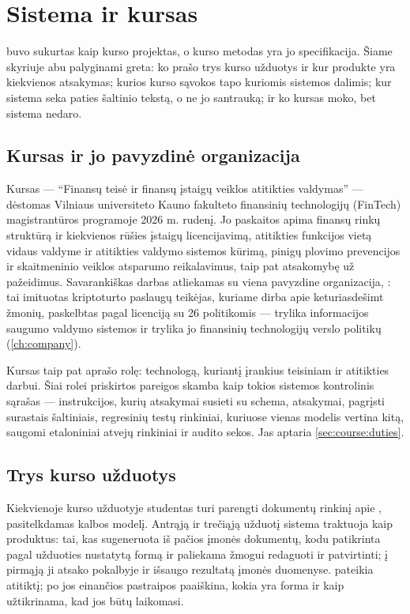 \chapter{Sistema ir kursas}\label{ch:course}

\product{} buvo sukurtas kaip kurso projektas, o kurso metodas yra jo specifikacija. Šiame
skyriuje abu palyginami greta: ko prašo trys kurso užduotys ir kur produkte yra kiekvienos
atsakymas; kurios kurso sąvokos tapo kuriomis sistemos dalimis; kur sistema seka paties šaltinio
tekstą, o ne jo santrauką; ir ko kursas moko, bet sistema nedaro.

\section{Kursas ir jo pavyzdinė organizacija}\label{sec:course:course}

Kursas --- \enquote{Finansų teisė ir finansų įstaigų veiklos atitikties valdymas} --- dėstomas
Vilniaus universiteto Kauno fakulteto finansinių technologijų (FinTech) magistrantūros
programoje 2026 m. rudenį. Jo paskaitos apima finansų rinkų struktūrą ir kiekvienos rūšies
įstaigų licencijavimą, atitikties funkcijos vietą vidaus valdyme ir atitikties valdymo sistemos
kūrimą, pinigų plovimo prevencijos ir skaitmeninio veiklos atsparumo reikalavimus, taip pat
atsakomybę už pažeidimus. Savarankiškas darbas atliekamas su viena pavyzdine organizacija,
\demo{}: tai imituotas kriptoturto paslaugų teikėjas, kuriame dirba apie keturiasdešimt žmonių,
paskelbtas pagal  licenciją su 26 politikomis --- trylika informacijos
saugumo valdymo sistemos ir trylika jo finansinių technologijų verslo politikų
(\cref{ch:company}).

Kursas taip pat aprašo rolę: technologą, kuriantį įrankius teisiniam ir atitikties darbui. Šiai
rolei priskirtos pareigos skamba kaip tokios sistemos kontrolinis sąrašas --- instrukcijos,
kurių atsakymai susieti su schema, atsakymai, pagrįsti surastais šaltiniais, regresinių testų
rinkiniai, kuriuose vienas modelis vertina kitą, saugomi etaloniniai atvejų rinkiniai ir audito
sekos. Jas aptaria \cref{sec:course:duties}.

\section{Trys kurso užduotys}\label{sec:course:assignments}

Kiekvienoje kurso užduotyje studentas turi parengti dokumentų rinkinį apie \demo{}, pasitelkdamas
kalbos modelį. Antrąją ir trečiąją užduotį sistema traktuoja kaip produktus: tai, kas sugeneruota
iš pačios įmonės dokumentų, kodu patikrinta pagal užduoties nustatytą formą ir paliekama žmogui
redaguoti ir patvirtinti; į pirmąją ji atsako pokalbyje ir išsaugo rezultatą įmonės duomenyse.
 pateikia atitiktį; po jos einančios pastraipos paaiškina, kokia
yra forma ir kaip užtikrinama, kad jos būtų laikomasi.

